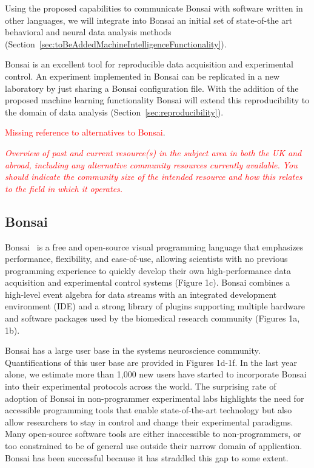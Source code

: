 \documentclass[a4paper,11point]{article}
\begin{document}
Using the proposed capabilities to communicate Bonsai with software written in
other languages, we will integrate into Bonsai an initial set of state-of-the
art behavioral and neural data analysis methods
(Section~\ref{sec:toBeAddedMachineIntelligenceFunctionality}).

Bonsai is an excellent tool for reproducible data acquisition and
experimental control. An experiment implemented in Bonsai can be replicated in
a new laboratory by just sharing a Bonsai configuration file. With the addition
of the proposed machine learning functionality Bonsai will extend this
reproducibility to the domain of data analysis
(Section~\ref{sec:reproducibility}).

\textcolor{red}{Missing reference to alternatives to Bonsai}.

\textcolor{red}{\textit{Overview of past and current resource(s) in the subject
area in both the UK and abroad, including any alternative community resources
currently available. You should indicate the community size of the intended
resource and how this relates to the field in which it operates.}}

\subsection{Bonsai}
\label{sec:bonsai}

Bonsai~\citep{lopesEtAl15,lopesAndMonteiro21} is a free and open-source visual
programming language that emphasizes performance, flexibility, and ease-of-use,
allowing scientists with no previous programming experience to quickly develop
their own high-performance data acquisition and experimental control systems
(Figure 1c). Bonsai combines a high-level event algebra for data streams with
an integrated development environment (IDE) and a strong library of plugins
supporting multiple hardware and software packages used by the biomedical
research community (Figures 1a, 1b).

Bonsai has a large user base in the systems neuroscience community.
Quantifications of this user base are provided in Figures 1d-1f.  In the last
year alone, we estimate more than 1,000 new users have started to incorporate
Bonsai into their experimental protocols across the world. The surprising rate
of adoption of Bonsai in non-programmer experimental labs highlights the need
for accessible programming tools that enable state-of-the-art technology but
also allow researchers to stay in control and change their experimental
paradigms.  Many open-source software tools are either inaccessible to
non-programmers, or too constrained to be of general use outside their narrow
domain of application. Bonsai has been successful because it has straddled this
gap to some extent.
\end{document}
